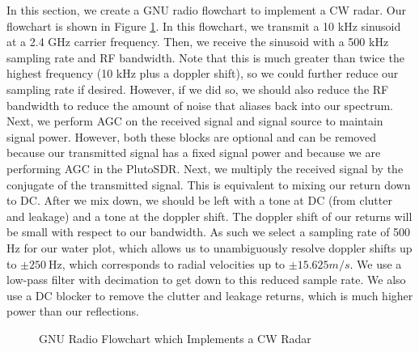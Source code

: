 \documentclass{article}
\begin{document}
In this section, we create a GNU radio flowchart to implement a CW radar. Our flowchart is shown in Figure \ref{fig::gnu_radio_block_diagram}. In this flowchart, we transmit a 10 kHz sinusoid at a 2.4 GHz carrier frequency. Then, we receive the sinusoid with a 500 kHz sampling rate and RF bandwidth. Note that this is much greater than twice the highest frequency (10 kHz plus a doppler shift), so we could further reduce our sampling rate if desired. However, if we did so, we should also reduce the RF bandwidth to reduce the amount of noise that aliases back into our spectrum. Next, we perform AGC on the received signal and signal source to maintain signal power. However, both these blocks are optional and can be removed because our transmitted signal has a fixed signal power and because we are performing AGC in the PlutoSDR. Next, we multiply the received signal by the conjugate of the transmitted signal. This is equivalent to mixing our return down to DC. After we mix down, we should be left with a tone at DC (from clutter and leakage) and a tone at the doppler shift. The doppler shift of our returns will be small with respect to our bandwidth. As such we select a sampling rate of 500 Hz for our water plot, which allows us to unambiguously resolve doppler shifts up to $\pm 250\ \text{Hz}$, which corresponds to radial velocities up to $\pm 15.625 m/s$. We use a low-pass filter with decimation to get down to this reduced sample rate. We also use a DC blocker to remove the clutter and leakage returns, which is much higher power than our reflections.



\begin{figure}[H]
    	\centering
    	\caption{GNU Radio Flowchart which Implements a CW Radar}
    	\label{fig::gnu_radio_block_diagram}
\end{figure}
\end{document}
